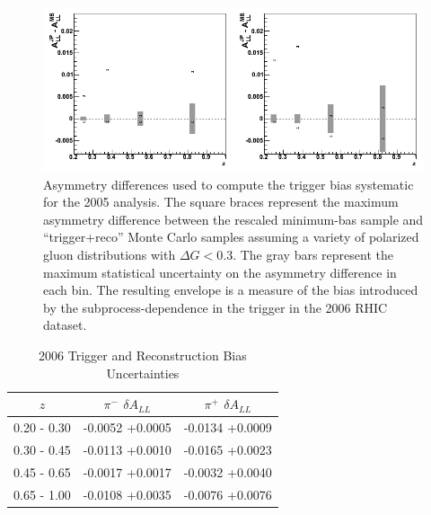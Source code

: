 \begin{figure}
  \centering
  \includegraphics[width=\textwidth]{figures/syst_mcasym_2006}
  \caption{Asymmetry differences used to compute the trigger bias systematic for the 2005 analysis. The square braces represent the maximum asymmetry difference between the rescaled minimum-bas sample and ``trigger+reco'' Monte Carlo samples assuming a variety of polarized gluon distributions with $\Delta G < 0.3$.  The gray bars represent the maximum statistical uncertainty on the asymmetry difference in each bin.  The resulting envelope is a measure of the bias introduced by the subprocess-dependence in the trigger in the 2006 RHIC dataset.}
  \label{fig:trig-bias-2006}
\end{figure}

\begin{table}[ht]
    \begin{center}
        \begin{tabular}{c|c|c}
        \hline
        $z$ & $\pi^{-}$ $\delta A_{LL}$ & $\pi^{+}$ $\delta A_{LL}$\\
        \hline
        0.20 - 0.30  & -0.0052 +0.0005 & -0.0134 +0.0009 \\
        0.30 - 0.45  & -0.0113 +0.0010 & -0.0165 +0.0023 \\
        0.45 - 0.65  & -0.0017 +0.0017 & -0.0032 +0.0040 \\
        0.65 - 1.00  & -0.0108 +0.0035 & -0.0076 +0.0076 \\
    \hline
    \end{tabular}
    \end{center}
    \caption{2006 Trigger and Reconstruction Bias Uncertainties}
    \label{tab:trig-bias-2006}
\end{table}
